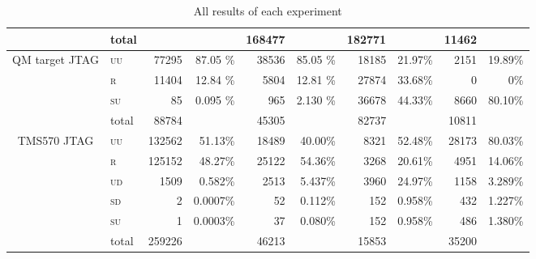 \documentclass[10pt]{article}
\newcommand{\TI}{TMS570\xspace}
\newcommand{\NXP}{QM target\xspace}
\newcommand{\jtag}{JTAG\xspace}
\newcommand{\UU}{\textsc{uu}\xspace}
\newcommand{\UD}{\textsc{ud}\xspace}
\newcommand{\SU}{\textsc{su}\xspace}
\newcommand{\SD}{\textsc{sd}\xspace}
\newcommand{\R}{\textsc{r}\xspace}
\begin{document}
\begin{table}[H]
\begin{tabular}{ll rr rr rr rr}
    \cmidrule(l){2-10}
    & total    
    & & 
    & 168477  &                 
    & 182771  &          
    & 11462&           
    \\       


    \midrule

    \multicolumn{1}{c}{\multirow{3}{*}{ \parbox{2cm}{\NXP \jtag}}}

    & \UU    
    & 77295  & 87.05 \%               
    & 38536  & 85.05 \%            
    & 18185  & 21.97\%              
    & 2151   & 19.89\%               
    \\
    & \R   
    & 11404  & 12.84 \%               
    & 5804   & 12.81 \%            
    & 27874  & 33.68\%              
    & 0   & 0\%               
    \\
    & \SU      
    & 85     & 0.095 \%               
    & 965    & 2.130 \%            
    & 36678  & 44.33\%              
    & 8660   & 80.10\%               
    \\

    \cmidrule(l){2-10}
    & total    
    & 88784  &                        
    & 45305  &                     
    & 82737  &                        
    & 10811  &                        
    \\


    \midrule

    \multicolumn{1}{c}{\multirow{3}{*}{ \parbox{2cm}{\TI \jtag }}}
    & \UU    
    & 132562 & 51.13\%               
    & 18489   & 40.00\%            
    & 8321   & 52.48\%       
    & 28173  & 80.03\%             
    \\
    & \R   
    & 125152     & 48.27\%               
    & 25122   & 54.36\%            
    & 3268   & 20.61\%       
    & 4951   & 14.06\%             
    \\
    & \UD  
    & 1509       &  0.582\%                      
    & 2513    & 5.437\%            
    & 3960   & 24.97\%       
    & 1158   & 3.289\%             
    \\
    & \SD     
    & 2       &  0.0007\%                  
    & 52      & 0.112\%            
    & 152    & 0.958\%       
    & 432    & 1.227\%             
    \\
    & \SU      
    & 1      & 0.0003\%               
    & 37      & 0.080\%            
    & 152    & 0.958\%       
    & 486    & 1.380\%             
    \\

    \cmidrule(l){2-10}
    & total    
    & 259226 &                        
    & 46213 &                       
    & 15853 &                 
    & 35200 &                       
    \\
    \bottomrule
    \end{tabular}
    \caption{All results of each experiment}
    \label{tab:all-results}
  \end{table}

 
\end{document}
